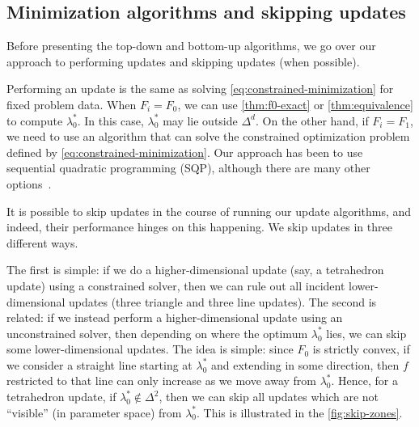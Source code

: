 \documentclass[eikonal.tex]{subfiles}
\begin{document}
\subsection{Minimization algorithms and skipping
  updates}\label{ssec:algorithms-and-skipping}

Before presenting the top-down and bottom-up algorithms, we go over
our approach to performing updates and skipping updates (when
possible).

Performing an update is the same as solving
\cref{eq:constrained-minimization} for fixed problem data. When
$F_i = F_0$, we can use \cref{thm:f0-exact} or \cref{thm:equivalence}
to compute $\lambda_0^*$. In this case, $\lambda_0^*$ may lie outside
$\Delta^d$. On the other hand, if $F_i = F_1$, we need to use an
algorithm that can solve the constrained optimization problem defined
by \cref{eq:constrained-minimization}. Our approach has been to use
sequential quadratic programming (SQP), although there are many other
options~\cite{bertsekas1999nonlinear,nocedal2006numerical}.

It is possible to skip updates in the course of running our update
algorithms, and indeed, their performance hinges on this happening. We
skip updates in three different ways.

The first is simple: if we do a higher-dimensional update (say, a
tetrahedron update) using a constrained solver, then we can rule out
all incident lower-dimensional updates (three triangle and three line
updates). The second is related: if we instead perform a
higher-dimensional update using an unconstrained solver, then
depending on where the optimum $\lambda_0^*$ lies, we can skip some
lower-dimensional updates. The idea is simple: since $F_0$ is strictly
convex, if we consider a straight line starting at $\lambda_0^*$ and
extending in some direction, then $f$ restricted to that line can only
increase as we move away from $\lambda_0^*$. Hence, for a tetrahedron
update, if $\lambda_0^* \notin \Delta^2$, then we can skip all updates
which are not ``visible'' (in parameter space) from
$\lambda_0^*$. This is illustrated in the \cref{fig:skip-zones}.
\end{document}
